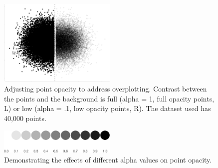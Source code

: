 \documentclass[manuscript, review, anonymous, screen]{acmart}
\begin{document}
\begin{figure}

\includegraphics[width=0.5\textwidth,height=\textheight]{size_and_opacity_files/figure-pdf/fig-overplotting-examples-1.pdf} \hfill{}

\caption{\label{fig-overplotting-examples}Adjusting point opacity to
address overplotting. Contrast between the points and the background is
full (alpha = 1, full opacity points, L) or low (alpha = .1, low opacity
points, R). The dataset used has 40,000 points.}

\end{figure}

\begin{figure}

\includegraphics[width=0.5\textwidth,height=\textheight]{size_and_opacity_files/figure-pdf/fig-alpha-examples-1.pdf} \hfill{}

\caption{\label{fig-alpha-examples}Demonstrating the effects of
different alpha values on point opacity.}

\end{figure}
\end{document}
